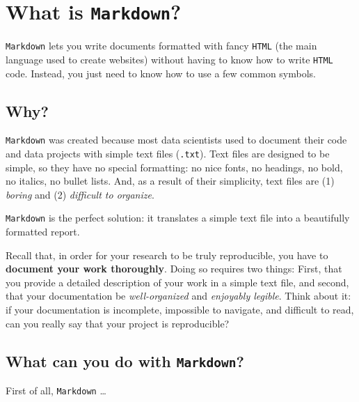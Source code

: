 \documentclass[]{book}
\begin{document}
\hypertarget{what-is-markdown}{%
\section*{\texorpdfstring{What is \texttt{Markdown}?}{What is Markdown?}}\label{what-is-markdown}}

\texttt{Markdown} lets you write documents formatted with fancy \texttt{HTML} (the main
language used to create websites) without having to know how to write \texttt{HTML}
code. Instead, you just need to know how to use a few common symbols.

\hypertarget{why-1}{%
\subsection*{Why?}\label{why-1}}

\texttt{Markdown} was created because most data scientists used to document their
code and data projects with simple text files (\texttt{.txt}). Text files are designed
to be simple, so they have no special formatting: no nice fonts, no headings,
no bold, no italics, no bullet lists. And, as a result of their simplicity,
text files are (1) \emph{boring} and (2) \emph{difficult to organize}.

\texttt{Markdown} is the perfect solution: it translates a simple text file into a
beautifully formatted report.

Recall that, in order for your research to be truly reproducible, you have to
\textbf{document your work thoroughly}. Doing so requires two things: First, that
you provide a detailed description of your work in a simple text file, and
second, that your documentation be \emph{well-organized} and \emph{enjoyably legible}.
Think about it: if your documentation is incomplete, impossible to navigate,
and difficult to read, can you really say that your project is reproducible?

\hypertarget{what-can-you-do-with-markdown}{%
\subsection*{\texorpdfstring{What can you do with \texttt{Markdown}?}{What can you do with Markdown?}}\label{what-can-you-do-with-markdown}}

First of all, \texttt{Markdown} \ldots{}
\end{document}

